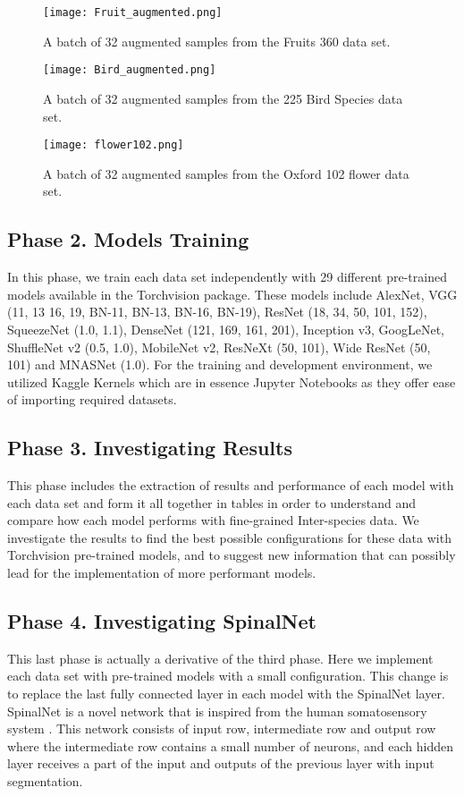 \documentclass[conference]{IEEEtran}
\begin{document}
\begin{figure}
  \centering
  \texttt{[image: Fruit\_augmented.png]}
  \caption{A batch of 32 augmented samples from the Fruits 360 data set.}
  \label{Bird_N_A}
\end{figure}

\begin{figure}
  \centering
  \texttt{[image: Bird\_augmented.png]}
  \caption{A batch of 32 augmented samples from the 225 Bird Species data set.}
  \label{Bird_A_A}
\end{figure}

\begin{figure}
  \centering
  \texttt{[image: flower102.png]}
  \caption{A batch of 32 augmented samples from the Oxford 102 flower data set.}
  \label{Flower_A_A}
\end{figure}


\subsection{Phase 2. Models Training}
In this phase, we train each data set independently with 29 different pre-trained models available in the Torchvision package. These models include AlexNet, VGG (11, 13 16, 19, BN-11, BN-13, BN-16, BN-19), ResNet (18, 34, 50, 101, 152), SqueezeNet (1.0, 1.1), DenseNet (121, 169, 161, 201), Inception v3, GoogLeNet, ShuffleNet v2 (0.5, 1.0), MobileNet v2, ResNeXt (50, 101), Wide ResNet (50, 101) and MNASNet (1.0).
For the training and development environment, we utilized Kaggle Kernels which are in essence Jupyter\cite{soton403913} Notebooks as they offer ease of importing required datasets.

\subsection{Phase 3. Investigating Results}
This phase includes the extraction of results and performance of each model with each data set and form it all together in tables in order to understand and compare how each model performs with fine-grained Inter-species data. We investigate the results to find the best possible configurations for these data with Torchvision pre-trained models, and to suggest new information that can possibly lead for the implementation of more performant models.

\subsection{Phase 4. Investigating SpinalNet}
This last phase is actually a derivative of the third phase. Here we implement each data set with pre-trained models with a small configuration. This change is to replace the last fully connected layer in each model with the SpinalNet\cite{kabir2020spinalnet} layer. SpinalNet is a novel network that is inspired from the human somatosensory system \cite{abbas2020spinenet}. This network consists of input row, intermediate row and output row where the intermediate row contains a small number of neurons, and each hidden layer receives a part of the input and outputs of the previous layer with input segmentation.
\end{document}
